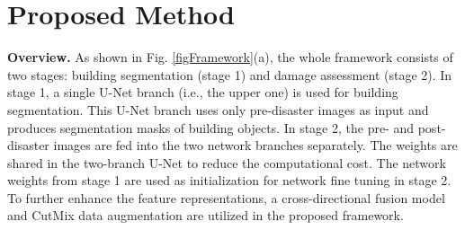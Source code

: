 \documentclass{article}
\begin{document}
\section{Proposed Method}
\label{secMethod}
\textbf{Overview.} 
As shown in Fig. \ref{figFramework}(a), the whole framework consists of two stages: building segmentation (stage 1) and damage assessment (stage 2). In stage 1, a single U-Net branch (i.e., the upper one) is used for building segmentation. This U-Net branch uses only pre-disaster images as input and produces segmentation masks of building objects. In stage 2, the pre- and post-disaster images are fed into the two network branches separately.
The weights are shared in the two-branch U-Net to reduce the computational cost. The network weights from stage 1 are used as initialization for network fine tuning in stage 2. To further enhance the feature representations, a cross-directional fusion model and CutMix data augmentation are utilized in the proposed framework.
\end{document}
